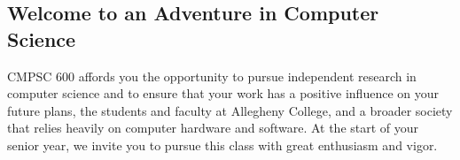 \documentclass[11pt]{article}
\begin{document}
\subsection*{Welcome to an Adventure in Computer Science}

CMPSC 600 affords you the opportunity to pursue independent research in computer
science and to ensure that your work has a positive influence on your future
plans, the students and faculty at Allegheny College, and a broader society that
relies heavily on computer hardware and software.  At the start of your senior
year, we invite you to pursue this class with great enthusiasm and vigor.
\end{document}
